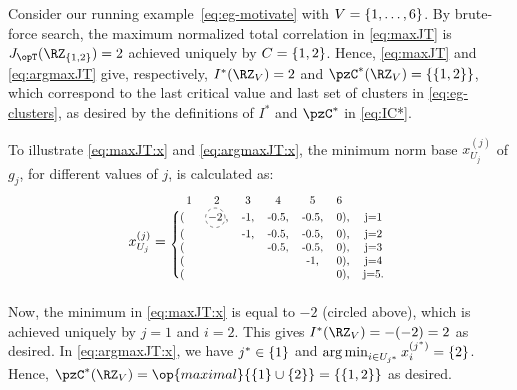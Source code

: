 \begin{example}
	\label{eg:IC*}
	Consider our running example~\eqref{eq:eg-motivate}
	with $V = \{1,\ldots,6\}$. By brute-force search, the maximum normalized total correlation in
	\eqref{eq:maxJT} is $J_{\opT}(\RZ_{\Set {1,2}})=2$ achieved uniquely by $C=\{1,2\}$. Hence,
	\eqref{eq:maxJT} and \eqref{eq:argmaxJT} give, respectively, $I^*(\RZ_V)=2$ and $\pzC^*(\RZ_V)=\Set {\Set
		{1,2}}$, which correspond to the last critical value and last set of clusters
		in \eqref{eq:eg-clusters}, as desired by the definitions of $I^*$ and $\pzC^*$ in
		\eqref{eq:IC*}. 
	
	To illustrate \eqref{eq:maxJT:x} and \eqref{eq:argmaxJT:x},  
	the minimum norm base $x_{U_{j}}^{(j)}$ of $g_{j}$, for different values of $j$, is calculated as:
	\begin{align*}
	x_{U_j}^{(j)} =
	\scalebox{0.8}{
		\begin{blockarray}{lcc ccl c}
		\phantom{n}1 &	2 & 3 & 4 & 5 & 6 \\
		\begin{block}{\{lcc ccc c}
		(&	\circled{-2}, & -1, & -0.5, & -0.5, & 0),   & j=1 \\
		(&	   & -1,  & -0.5, & -0.5, & 0),   & j=2 \\
		(&	   &      & -0.5, & -0.5, & 0),   & j=3 \\
		(&	   &      &      & -1,   & 0),   & j=4 \\
		(&	   &      &      &      & 0),   & j=5. \\
		\end{block}
		\end{blockarray}}
	\end{align*}
%	
	Now, the minimum in \eqref{eq:maxJT:x} is equal to $-2$ (circled above), which is achieved uniquely by $j=1$ and $i=2$. This gives $I^*(\RZ_V)=-(-2)=2$ as desired. In \eqref{eq:argmaxJT:x}, we have $j^*\in \{1\}$ and $\operatorname*{arg\,min}_{i\in U_{j^*}} x_i^{(j^*)}=\{2\}$. Hence, $\pzC^*(\RZ_V)=\op{maximal}\Set {\Set {1}\cup \Set {2}}=\Set {\Set {1,2}}$ as desired.	
\end{example}


